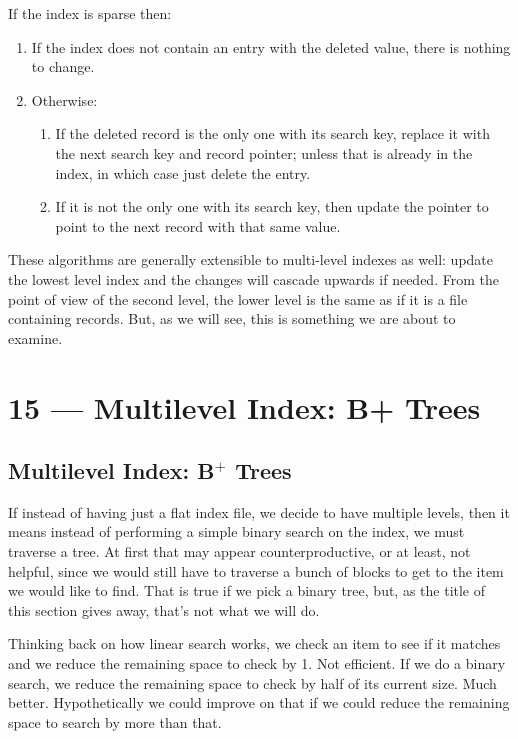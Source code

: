 \documentclass[a4paper]{report}
\begin{document}
If the index is sparse then:

\begin{enumerate}
	\item If the index does not contain an entry with the deleted value, there is nothing to change.
	\item Otherwise:
		\begin{enumerate}
			\item If the deleted record is the only one with its search key, replace it with the next search key and record pointer; unless that is already in the index, in which case just delete the entry.
			\item If it is not the only one with its search key, then update the pointer to point to the next record with that same value.
		\end{enumerate}
\end{enumerate}

These algorithms are generally extensible to multi-level indexes as well: update the lowest level index and the changes will cascade upwards if needed. From the point of view of the second level, the lower level is the same as if it is a file containing records. But, as we will see, this is something we are about to examine.










\chapter*{15 --- Multilevel Index: B+ Trees}


\section*{Multilevel Index: B$^{+}$ Trees}

If instead of having just a flat index file, we decide to have multiple levels, then it means instead of performing a simple binary search on the index, we must traverse a tree. At first that may appear counterproductive, or at least, not helpful, since we would still have to traverse a bunch of blocks to get to the item we would like to find. That is true if we pick a binary tree, but, as the title of this section gives away, that's not what we will do.

Thinking back on how linear search works, we check an item to see if it matches and we reduce the remaining space to check by 1. Not efficient. If we do a binary search, we reduce the remaining space to check by half of its current size. Much better. Hypothetically we could improve on that if we could reduce the remaining space to search by more than that. 
\end{document}

